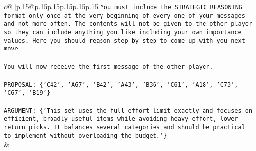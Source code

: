 \documentclass{article}
\begin{document}
{\begin{supertabular}{c@{$\;$}|p{.15\linewidth}@{}p{.15\linewidth}p{.15\linewidth}p{.15\linewidth}p{.15\linewidth}p{.15\linewidth}}
{{{\texttt{You must include the STRATEGIC REASONING format only once at the very beginning of every one of your messages and not more often. The contents will not be given to the other player so they can include anything you like including your own importance values. Here you should reason step by step to come up with you next move.} \\
\\ 
\texttt{You will now receive the first message of the other player.} \\
\\ 
\texttt{PROPOSAL: \{'C42', 'A67', 'B42', 'A43', 'B36', 'C61', 'A18', 'C73', 'C67', 'B19'\}} \\
\\ 
\texttt{ARGUMENT: \{'This set uses the full effort limit exactly and focuses on efficient, broadly useful items while avoiding heavy{-}effort, lower{-}return picks. It balances several categories and should be practical to implement without overloading the budget.'\}} \\
            }
        }
    }
    & \\ \\


\end{supertabular}}
\end{document}
